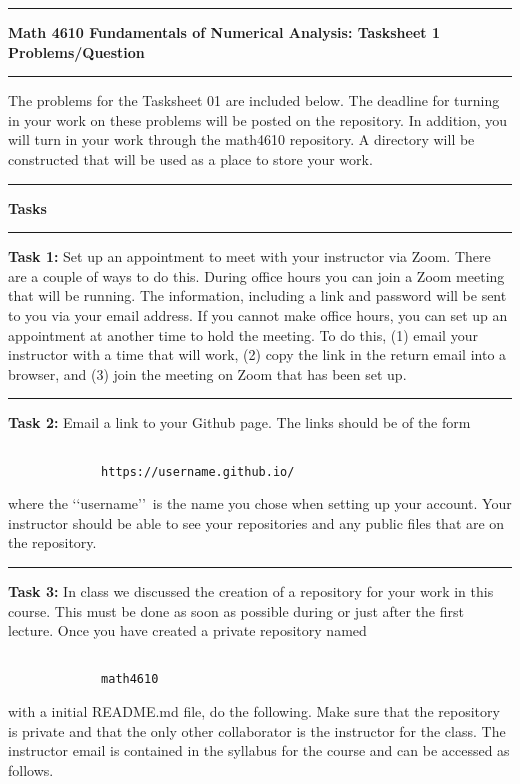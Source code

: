 \documentclass[10pt,fleqn]{article}
\begin{document}
\vskip0.1in\hrule\vskip0.1in \noindent
{\bf{\Large Math 4610 Fundamentals of Numerical Analysis: Tasksheet 1 Problems/Question}}
\vskip0.1in\hrule\vskip0.1in \noindent
The problems for the Tasksheet 01 are included below. The deadline for turning
in your work on these problems will be posted on the repository. In addition,
you will turn in your work through the math4610 repository. A directory will be
constructed that will be used as a place to store your work.
\vskip0.1in\hrule\vskip0.1in \noindent
{\bf{\large Tasks}}
\vskip0.1in\hrule\vskip0.1in \noindent
\begin{trivlist}
  \item[\bf Task 1:] Set up an appointment to meet with your instructor via
        Zoom. There are a couple of ways to do this. During office hours you
        can join a Zoom meeting that will be running. The information, including
        a link and password will be sent to you via your email address. If you
        cannot make office hours, you can set up an appointment at another time
        to hold the meeting. To do this, (1) email your instructor with a time
        that will work, (2) copy the link in the return email into a browser,
        and (3) join the meeting on Zoom that has been set up.
\vskip0.1in\hrule\vskip0.1in \noindent
  \item[\bf Task 2:] Email a link to your Github page. The links should be of
        the form
        \begin{verbatim}

             https://username.github.io/

        \end{verbatim}
        where the \lq\lq username\rq\rq\ is the name you chose when setting up
        your account. Your instructor should be able to see your repositories 
        and any public files that are on the repository.
\vskip0.1in\hrule\vskip0.1in \noindent
  \item[\bf Task 3:] In class we discussed the creation of a repository for
        your work in this course. This must be done as soon as possible during
        or just after the first lecture. Once you have created a private
        repository named
        \begin{verbatim}

             math4610

        \end{verbatim}
        with a initial README.md file, do the following. Make sure that the
        repository is private and that the only other collaborator is the
        instructor for the class. The instructor email is contained in the
        syllabus for the course and can be accessed as follows.
        \begin{verbatim}


\end{verbatim}
\end{trivlist}
\end{document}
